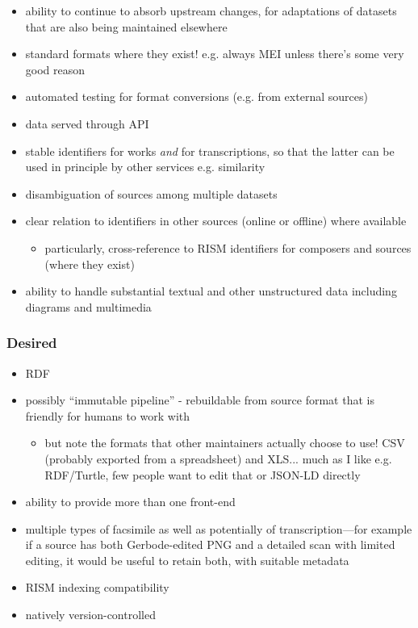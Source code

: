 \documentclass[sigconf, nonacm=true]{acmart}
\begin{document}
\begin{sloppypar}
  \begin{itemize}
  \item ability to continue to absorb upstream changes, for
    adaptations of datasets that are also being maintained elsewhere
  \item standard formats where they exist! e.g. always MEI unless
    there's some very good reason
  \item automated testing for format conversions (e.g. from external sources)
  \item data served through API
  \item stable identifiers for works {\em and} for transcriptions, so
    that the latter can be used in principle by other services
    e.g. similarity
  \item disambiguation of sources among multiple datasets
  \item clear relation to identifiers in other sources (online or
    offline) where available
    \begin{itemize}
    \item particularly, cross-reference to RISM identifiers for
      composers and sources (where they exist)
    \end{itemize}
  \item ability to handle substantial textual and other unstructured
    data including diagrams and multimedia

  \end{itemize}

  \subsubsection{Desired}
  
  \begin{itemize}
  \item RDF
  \item possibly ``immutable pipeline'' - rebuildable from source
    format that is friendly for humans to work with
    \begin{itemize}
      \item but note the formats that other maintainers actually choose to
        use! CSV (probably exported from a spreadsheet) and
        XLS... much as I like e.g. RDF/Turtle, few people want to edit
        that or JSON-LD directly
    \end{itemize}
  \item ability to provide more than one front-end
  \item multiple types of facsimile as well as potentially of
    transcription---for example if a source has both Gerbode-edited
    PNG and a detailed scan with limited editing, it would be useful
    to retain both, with suitable metadata
  \item RISM indexing compatibility
  \item natively version-controlled
  \end{itemize}


\end{sloppypar}
\end{document}
